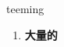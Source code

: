 
\begin{frame}
{\huge teeming}
\begin{center}
\begin{enumerate}\Large
  \item \textbf{大量的}
\end{enumerate}
\end{center}
\end{frame}

